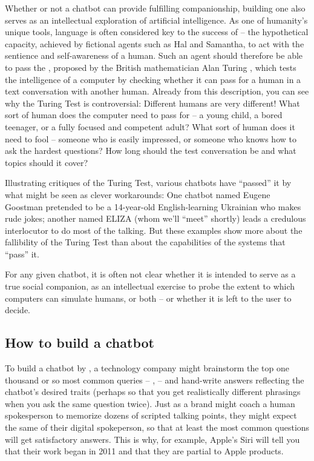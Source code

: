 Whether or not a chatbot can provide fulfilling companionship, building one  also serves as an intellectual exploration of artificial intelligence.  As one of humanity's unique tools, language is often considered key to the success of  -- the hypothetical capacity, achieved by fictional agents such as Hal and Samantha, to act with the sentience and self-awareness of a human.  Such an  agent should therefore be able to pass the , proposed by the British mathematician Alan Turing \citep{turing}, which tests the intelligence of a computer  by checking whether it can pass for a human in a text conversation with another human.  Already from this description, you can see why the Turing Test is controversial: Different humans are very different!  What sort of human does the computer need to pass for -- a young child,  a bored teenager, or a fully focused and competent adult? 
What sort of human does it need to fool -- someone who is easily impressed, or someone who knows how to ask the hardest questions?  How long should the test conversation be and what topics should it cover?  

Illustrating critiques of the Turing Test, various chatbots have ``passed'' it by what might be seen as clever workarounds: One chatbot named Eugene Goostman pretended to be a 14-year-old English-learning Ukrainian who makes rude jokes; another named ELIZA (whom we'll ``meet'' shortly) leads a credulous interlocutor to do most of the talking.  But these examples show more about the fallibility of the Turing Test than about the capabilities of the systems that ``pass'' it.

For any given chatbot, it is often not clear whether it is intended to serve as a true social companion, as an intellectual exercise to probe the extent to which computers can simulate humans, or both -- or whether it is left to the user to decide.


\subsection{How to build a chatbot}

To build a chatbot by , a technology company might brainstorm the top one thousand or so most common queries -- ,  -- and hand-write answers reflecting the chatbot's desired traits (perhaps so that you get realistically different phrasings when you ask the same question twice).  Just as a brand might coach a human spokesperson to memorize dozens of scripted talking points, they might expect the same of their digital spokeperson, so that at least the most common questions will get satisfactory answers.   This is why, for example, Apple's Siri will tell you that their work began in 2011 and that they are partial to Apple products.  

